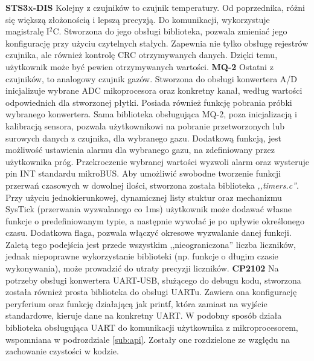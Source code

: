 \textbf{STS3x-DIS}
\newline
Kolejny z czujników to czujnik temperatury. Od poprzednika, różni się większą złożonością i lepszą precyzją. Do komunikacji, wykorzystuje magistralę I$^2$C. Stworzona do jego obsługi biblioteka, pozwala zmieniać jego konfigurację przy użyciu czytelnych stałych. Zapewnia nie tylko obsługę rejestrów czujnika, ale również kontrolę CRC otrzymywanych danych. Dzięki temu, użytkownik może być pewien otrzymywanych wartości.
\newline
\newline
\textbf{MQ-2}
\newline
Ostatni z czujników, to analogowy czujnik gazów. Stworzona do obsługi konwertera A/D inicjalizuje wybrane ADC mikoprocesora oraz konkretny kanał, według wartości odpowiednich dla stworzonej płytki. Posiada również funkcję pobrania próbki wybranego konwertera. Sama biblioteka obsługująca MQ-2, poza inicjalizacją i kalibracją sensora, pozwala użytkownikowi na pobranie przetworzonych lub surowych danych z czujnika, dla wybranego gazu. Dodatkową funkcją, jest możliwość ustawienia alarmu dla wybranego gazu, na zdefiniowany przez użytkownika próg. Przekroczenie wybranej wartości wyzwoli alarm oraz wysteruje pin INT standardu mikroBUS\texttrademark. Aby umożliwić swobodne tworzenie funkcji przerwań czasowych w dowolnej ilości, stworzona została biblioteka \textit{,,timers.c''}. Przy użyciu jednokierunkowej, dynamicznej listy stuktur oraz mechanizmu SysTick (przerwania wyzwalanego co 1ms) użytkownik może dodawać własne funkcje o predefiniowanym typie, a następnie wywołać je po upływie określonego czasu. Dodatkowa flaga, pozwala włączyć okresowe wyzwalanie danej funkcji. Zaletą tego podejścia jest przede wszystkim ,,nieograniczona'' liczba liczników, jednak niepoprawne wykorzystanie biblioteki (np. funkcje o długim czasie wykonywania), może prowadzić do utraty precyzji liczników.
\newline
\newline
\textbf{CP2102}
\newline
Na potrzeby obsługi konwertera UART-USB, służącego do debugu kodu, stworzona została również prosta biblioteka do obsługi UARTu. Zawiera ona konfigurację peryferium oraz funkcję działającą jak printf, która zamiast na wyjście standardowe, kieruje dane na konkretny UART. W podobny sposób działa biblioteka obsługująca UART do komunikacji użytkownika z mikroprocesorem, wspomniana w podrozdziale \ref{sub:api}. Zostały one rozdzielone ze względu na zachowanie czystości w kodzie.
